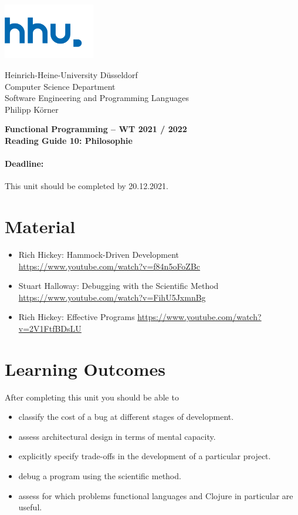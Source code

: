 \documentclass[11pt,a4paper]{article}
\begin{document}
\begin{minipage}[b]{\textwidth}
	\parbox[t]{5cm}{%
		\includegraphics[width=4cm]{unilogo}
		\hfill
	}
	\parbox[b]{11cm}{%
		Heinrich-Heine-University D\"usseldorf\\
		Computer Science Department\\
		Software Engineering and Programming Languages\\
		Philipp K\"orner
	}
\end{minipage}
\begin{center}
	\bf
	Functional Programming -- WT 2021 / 2022\\
	Reading Guide 10: Philosophie
\end{center}

\pagestyle{empty}

\paragraph{Deadline:} This unit should be completed by 20.12.2021.

\section{Material} 

\begin{itemize}
\item Rich Hickey: Hammock-Driven Development \url{https://www.youtube.com/watch?v=f84n5oFoZBc}
\item Stuart Halloway: Debugging with the Scientific Method \url{https://www.youtube.com/watch?v=FihU5JxmnBg}
\item Rich Hickey: Effective Programs \url{https://www.youtube.com/watch?v=2V1FtfBDsLU}
\end{itemize}


\section{Learning Outcomes}

After completing this unit you should be able to

\begin{itemize}
    \item classify the cost of a bug at different stages of development.
    \item assess architectural design in terms of mental capacity.
    \item explicitly specify trade-offs in the development of a particular project.
    \item debug a program using the scientific method.
    \item assess for which problems functional languages and Clojure in particular are useful.
\end{itemize}
\end{document}
